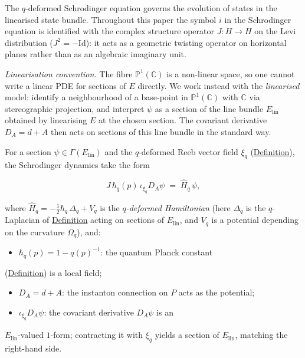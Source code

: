 \begin{remark}
  \label{rem:schrodinger-jet-coaction}
The $q$-deformed Schrodinger equation governs the evolution of states
in the linearised state bundle. Throughout this paper the symbol $i$ in
the Schrodinger equation is identified with the complex structure
operator $J \colon H \to H$ on the Levi distribution ($J^2 = -\mathrm{Id}$):
it acts as a geometric twisting operator on horizontal planes rather than
as an algebraic imaginary unit.

\emph{Linearisation convention.}
The fibre $\mathbb{P}^1(\mathbb{C})$ is a non-linear space, so one cannot write a
linear PDE for sections of $E$ directly. We work instead with the
\emph{linearised} model: identify a neighbourhood of a base-point in
$\mathbb{P}^1(\mathbb{C})$ with $\mathbb{C}$ via stereographic projection, and
interpret $\psi$ as a section of the line bundle $E_{\mathrm{lin}}$
obtained by linearising $E$ at the chosen section. The covariant
derivative $D_A = d + A$ then acts on sections of this line bundle in the
standard way.

For a section $\psi \in \Gamma(E_{\mathrm{lin}})$ and the $q$-deformed Reeb
vector field $\xi_q$ (\hyperref[def:q-reeb-vector-field]{Definition}), the
Schrodinger dynamics take the form

\[
J\,\hbar_q(p)\,\iota_{\xi_q} D_A \psi \;=\; \hat{H}_q\, \psi,
\]

where $\hat{H}_q = -\tfrac{1}{2}\hbar_q\,\Delta_q + V_q$ is the
\emph{$q$-deformed Hamiltonian} (here $\Delta_q$ is the $q$-Laplacian of
\hyperref[def:q-harmonic-form]{Definition} acting on sections of
$E_{\mathrm{lin}}$, and $V_q$ is a potential depending on the curvature
$\Omega_q$), and:

\begin{itemize}
  \item $\hbar_q(p) = 1 - q(p)^{-1}$: the quantum Planck constant
\end{itemize}
  (\hyperref[def:quantum-planck-constant]{Definition}) is a local field;
\begin{itemize}
  \item $D_A = d + A$: the instanton connection on $P$ acts as the potential;
  \item $\iota_{\xi_q} D_A \psi$: the covariant derivative $D_A\psi$ is an
\end{itemize}
  $E_{\mathrm{lin}}$-valued $1$-form; contracting it with $\xi_q$
  yields a section of $E_{\mathrm{lin}}$, matching the right-hand side.


\end{remark}
